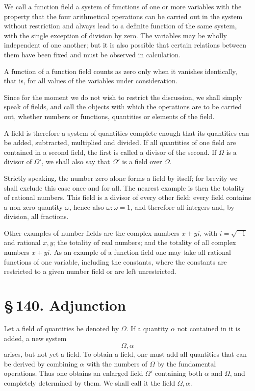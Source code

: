 \documentclass[11pt]{article}
\providecommand{\sect}[2]{\section*{\S\,#1. #2}}
\begin{document}
We call a function field a system of functions of one or more variables with the property that the four arithmetical operations can be carried out in the system without restriction and always lead to a definite function of the same system, with the single exception of division by zero. The variables may be wholly independent of one another; but it is also possible that certain relations between them have been fixed and must be observed in calculation.

A function of a function field counts as zero only when it vanishes identically, that is, for all values of the variables under consideration.

Since for the moment we do not wish to restrict the discussion, we shall simply speak of fields, and call the objects with which the operations are to be carried out, whether numbers or functions, quantities or elements of the field.

A field is therefore a system of quantities complete enough that its quantities can be added, subtracted, multiplied and divided. If all quantities of one field are contained in a second field, the first is called a divisor of the second. If $\Omega$ is a divisor of $\Omega'$, we shall also say that $\Omega'$ is a field over $\Omega$.

Strictly speaking, the number zero alone forms a field by itself; for brevity we shall exclude this case once and for all. The nearest example is then the totality of rational numbers. This field is a divisor of every other field: every field contains a non-zero quantity $\omega$, hence also $\omega:\omega=1$, and therefore all integers and, by division, all fractions.

Other examples of number fields are the complex numbers $x+yi$, with $i=\sqrt{-1}$ and rational $x,y$; the totality of real numbers; and the totality of all complex numbers $x+yi$. As an example of a function field one may take all rational functions of one variable, including the constants, where the constants are restricted to a given number field or are left unrestricted.

\sect{140}{Adjunction}

Let a field of quantities be denoted by $\Omega$. If a quantity $\alpha$ not contained in it is added, a new system
\[
        \Omega,\alpha
\]
arises, but not yet a field. To obtain a field, one must add all quantities that can be derived by combining $\alpha$ with the numbers of $\Omega$ by the fundamental operations. Thus one obtains an enlarged field $\Omega'$ containing both $\alpha$ and $\Omega$, and completely determined by them. We shall call it the field $\Omega,\alpha$.
\end{document}
